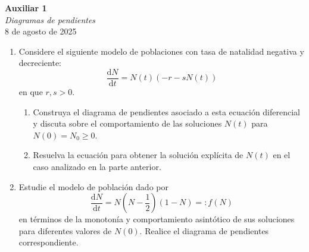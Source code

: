 \documentclass{article}
\begin{document}


\begin{center}
    \Huge{\textbf{Auxiliar 1}}\\
\textit{\large{Diagramas de pendientes}}\\
    \normalsize
    8 de agosto de 2025
\end{center}

\begin{enumerate}
	\item Considere el siguiente modelo de poblaciones con tasa de natalidad negativa y decreciente:
$$
	\frac{\mathrm{d}N}{\mathrm{d}t} = N(t) (-r - sN(t))
$$
en que $r, s > 0$.
\begin{enumerate}
	\item Construya el diagrama de pendientes asociado a esta ecuación diferencial y discuta sobre el comportamiento de las soluciones $N(t)$ para $N(0) = N_0 \geq 0$.
	\item Resuelva la ecuación para obtener la solución explícita de $N(t)$ en el caso analizado en la parte anterior.
\end{enumerate}
\item Estudie el modelo de población dado por
$$
\frac{\mathrm{d}N}{\mathrm{d}t} = N\left(N - \frac{1}{2}\right)(1 - N) =: f(N)
$$
en términos de la monotonía y comportamiento asintótico de sus soluciones para diferentes valores de $N(0)$. Realice el diagrama de pendientes correspondiente.

\end{enumerate}
\end{document}
